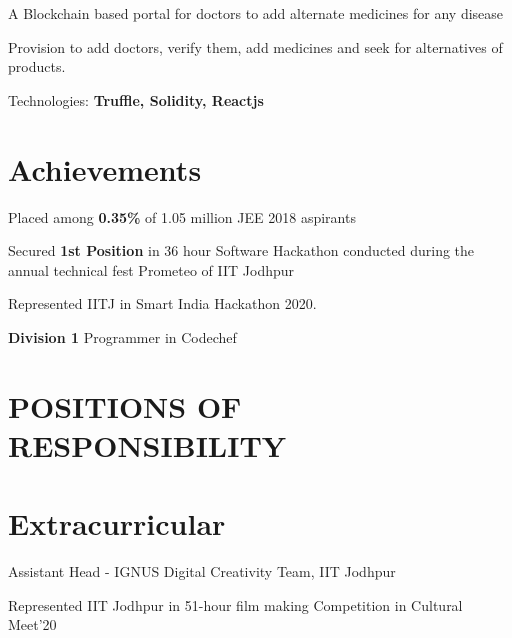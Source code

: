 \documentclass[]{deedy-resume-openfont}
\begin{document}
\begin{minipage}[t]{0.63\textwidth}
\begin{tightemize}
\item A Blockchain based portal for doctors to add alternate medicines for any disease
\item Provision to add doctors, verify them, add medicines and seek for alternatives of products.
\item Technologies: \textbf{Truffle, Solidity, Reactjs}
\end{tightemize}
\sectionsep


\section{Achievements}
\vspace{\topsep}
\begin{tightemize}
\item Placed among \textbf{0.35\%} of 1.05 million JEE 2018 aspirants
\item Secured \textbf{1st Position} in 36 hour Software Hackathon conducted during the annual technical fest Prometeo of IIT Jodhpur
\item Represented IITJ in Smart India Hackathon 2020.
\item \textbf{Division 1} Programmer in Codechef

\end{tightemize}
\sectionsep


\section{POSITIONS OF RESPONSIBILITY}
\sectionsep


\section{Extracurricular}
\vspace{\topsep} %
\begin{tightemize}
\item Assistant Head - IGNUS Digital Creativity Team, IIT Jodhpur
\item Represented IIT Jodhpur in 51-hour film making Competition in Cultural Meet'20
\end{tightemize}
\sectionsep

\end{minipage}
\end{document}
